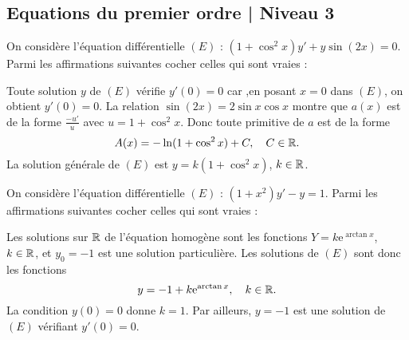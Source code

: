\subsection{Equations du premier ordre | Niveau 3}

\begin{question}
On considère l'équation différentielle $(E)$ : $\displaystyle \left(1+\cos ^2x\right)y'+y\sin (2x)=0$. Parmi les affirmations suivantes cocher celles qui sont vraies :
\begin{answers}  
\end{answers}
\begin{explanations}
Toute solution $y$ de $(E)$ vérifie $y'(0)=0$ car ,en posant $x=0$ dans $(E)$, on obtient $y'(0)=0$. La relation $\sin(2x)=2\sin x \cos x$ montre que $a(x)$ est de la forme $\displaystyle \frac{-u'}{u}$ avec $u=1+\cos ^2x$. Donc toute primitive de $a$ est de la forme
$$A(x)=-\ln (1+\cos ^2x)+C,\quad C\in \mathbb{R}.$$
La solution générale de $(E)$ est $y=k(1+\cos ^2x)$, $k\in \mathbb{R}$.
\end{explanations}
\end{question}

\begin{question}
On considère l'équation différentielle $(E)$ : $\displaystyle (1+x^2)y'-y=1$. Parmi les affirmations suivantes cocher celles qui sont vraies :
\begin{answers}  
\end{answers}
\begin{explanations}
Les solutions sur $\mathbb{R}$ de l'équation homogène sont les fonctions $\displaystyle Y=k\mathrm{e}^{\arctan x}$, $k\in \mathbb{R}$, et $y_0=-1$ est une solution particulière. Les solutions de $(E)$ sont donc les fonctions
$$y=-1+k\mathrm{e}^{\arctan x},\quad k\in \mathbb{R}.$$
La condition $y(0)=0$ donne $k=1$. Par ailleurs, $y=-1$ est une solution de $(E)$ vérifiant $y'(0)=0$.
\end{explanations}
\end{question}


